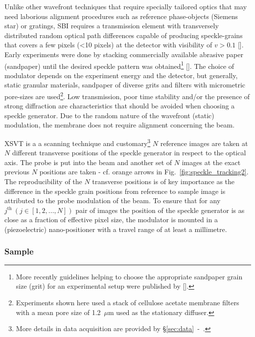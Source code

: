 \begin{refsection}
Unlike other wavefront techniques that require specially tailored optics that may need laborious alignment procedures such as reference phase-objects (Siemens star) or gratings, SBI requires a transmission element with transversely distributed random optical path differences capable of producing speckle-grains that covers a few pixels (<10 pixels) at the detector with visibility of $ v>0.1$ [\cite[\textit{\S2.3}]{Berujon2020a}]. Early experiments were done by stacking commercially available abrasive paper (sandpaper) until the desired speckle pattern was obtained\footnote{More recently guidelines helping to choose the appropriate sandpaper grain size (grit) for an experimental setup were published by [\cite{Tian2020}].} [\cite{Morgan2012, Wang2016}]. The choice of modulator depends on the experiment energy and the detector, but generally, static granular materials, sandpaper of diverse grits and filters with micrometric pore-sizes are used\footnote{Experiments shown here used a stack of cellulose acetate membrane filters with a mean pore size of 1.2~$\mu$m used as the stationary diffuser.}. Low transmission, poor time stability and/or the presence of strong diffraction are characteristics that should be avoided when choosing a speckle generator. Due to the random nature of the wavefront (static) modulation, the membrane does not require alignment concerning the beam. 

XSVT is a a scanning technique and customary\footnote{More details in data acquisition are provided by \S\ref{sec:data}~-~\textit{}.} $N$ reference images are taken at $N$ different transverse positions of the speckle generator in respect to the optical axis. The probe is put into the beam and another set of $N$ images at the exact previous $N$ positions are taken - cf. orange arrows in Fig.~\ref{fig:speckle_tracking2}. The reproducibility of the $N$ transverse positions is of key importance as the difference in the speckle grain positions from reference to sample image is attributed to the probe modulation of the beam. To ensure that for any $j^\text{th}~(j\in[1,2,...,N])$ pair of images the position of the speckle generator is as close as a fraction of effective pixel size, the modulator is mounted in a (piezoelectric) nano-positioner with a travel range of at least a millimetre. 

\subsubsection*{Sample}


\end{refsection}
